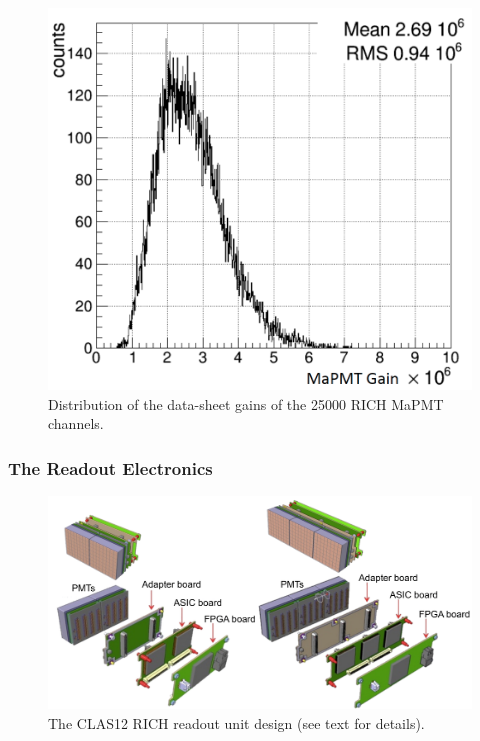 \documentclass[5p,times,twocolumn]{elsarticle}
\begin{document}
\begin{figure}[t]
\begin{center}
\includegraphics[width=0.85\columnwidth]{Gain2.png}
\end{center}
\caption{Distribution of the data-sheet gains of the 25000 RICH MaPMT channels.}
\label{fig:MaPMTGain}
\end{figure}

\subsubsection{The Readout Electronics}

\begin{figure}[t]
\begin{center}
\includegraphics[width=1.00\columnwidth]{TileAssembly.pdf}
\end{center}
\caption{The CLAS12 RICH readout unit design (see text for details).}
\label{fig:EleTile}
\end{figure}
\end{document}
